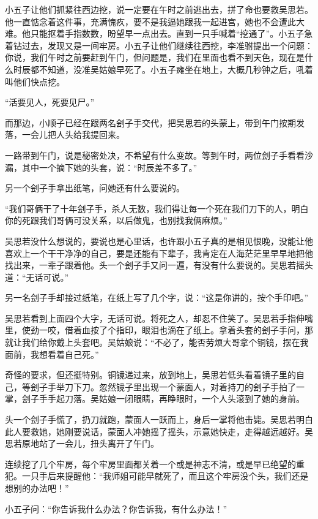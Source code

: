小五子让他们抓紧往西边挖，说一定要在午时之前逃出去，拼了命也要救吴思若。他一直惦念着这件事，充满愧疚，要不是我逼她跟我一起进宫，她也不会遭此大难。他只能抠着手指数数，盼望早一点出去。直到一只手喊着“挖通了”。小五子急着钻过去，发现又是一间牢房。小五子让他们继续往西挖，李准驸提出一个问题：你说，我们午时之前要赶到午门，但问题是，我们在里面也看不到天色，现在是什么时辰都不知道，没准吴姑娘早死了。小五子瘫坐在地上，大概几秒钟之后，吼着叫他们快点挖。

“活要见人，死要见尸。”
\newline

而那边，小顺子已经在跟两名刽子手交代，把吴思若的头蒙上，带到午门按期发落，一会儿把人头给我提回来。

一路带到午门，说是秘密处决，不希望有什么变故。等到午时，两位刽子手看看沙漏，其中一个摘下她的头套，说：“时辰差不多了。”

另一个刽子手拿出纸笔，问她还有什么要说的。

“我们哥俩干了十年刽子手，杀人无数，我们得让每一个死在我们刀下的人，明白你的死跟我们哥俩可没关系，以后做鬼，也别找我俩麻烦。”

吴思若没什么想说的，要说也是心里话，也许跟小五子真的是相见恨晚，没能让他喜欢上一个干干净净的自己，要是还能有下辈子，我肯定在人海茫茫里早早地把他找出来，一辈子跟着他。头一个刽子手又问一遍，有没有什么要说的。吴思若摇头道：“无话可说。”

另一名刽子手却接过纸笔，在纸上写了几个字，说：“这是你讲的，按个手印吧。”

吴思若看到上面四个大字，无话可说。将死之人，却忍不住笑了。吴思若手指伸嘴里，使劲一咬，借着血按了个指印，眼泪也滴在了纸上。拿着头套的刽子手问，那就让我们给你戴上头套吧。吴姑娘说：“不必了，能否劳烦大哥拿个铜镜，摆在我面前，我想看着自己死。”

奇怪的要求，但还挺特别。铜镜递过来，放到地上，吴思若低头看着镜子里的自己，等刽子手举刀下刀。忽然镜子里出现一个蒙面人，对着持刀的刽子手拍了一掌，刽子手手起刀落。吴姑娘一闭眼睛，再睁眼时，一个人头滚到了她的身前。

头一个刽子手慌了，扔刀就跑，蒙面人一跃而上，身后一掌将他击毙。吴思若明白此人要救她，她刚要说话，蒙面人冲她摇了摇头，示意她快走，走得越远越好。吴思若原地站了一会儿，扭头离开了午门。
\newline

连续挖了几个牢房，每个牢房里面都关着一个或是神志不清，或是早已绝望的重犯。一只手后来提醒他：“我师姐可能早就死了，而且这个牢房没个头，我们还是想别的办法吧！”

小五子问：“你告诉我什么办法？你告诉我，有什么办法！”

